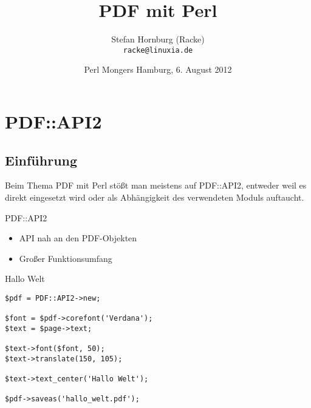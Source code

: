 \usepackage[utf8]{inputenc}
\usepackage[T1]{fontenc}
\usepackage{mathptmx}
\usepackage[scaled=.90]{helvet}
\usepackage{courier}

\usepackage{beamerthemesplit}
\usepackage{verbatim}
\usepackage{hyperref}
\usepackage{graphicx}

\usepackage{listings}
\lstset{language=Perl,basicstyle=\footnotesize,tabsize=3,showstringspaces=false}

\title{PDF mit Perl}
\author[racke]{Stefan Hornburg (Racke)\\ \texttt{racke@linuxia.de}}
\date[]{Perl Mongers Hamburg, 6. August 2012}


\maketitle{}

\begin{frame}
  \titlepage
\end{frame}

\tableofcontents

\section{PDF::API2}

\subsection{Einführung}

Beim Thema PDF mit Perl stößt man meistens auf PDF::API2,
entweder weil es direkt eingesetzt wird oder als Abhängigkeit
des verwendeten Moduls auftaucht.

\begin{frame}{PDF::API2}
\begin{itemize}
\item API nah an den PDF-Objekten
\item Großer Funktionsumfang
\end{itemize}
\end{frame}

\begin{frame}[fragile]{Hallo Welt}
\begin{lstlisting}
$pdf = PDF::API2->new;

$font = $pdf->corefont('Verdana');
$text = $page->text;

$text->font($font, 50);
$text->translate(150, 105);

$text->text_center('Hallo Welt');

$pdf->saveas('hallo_welt.pdf');
\end{lstlisting}
\end{frame}

